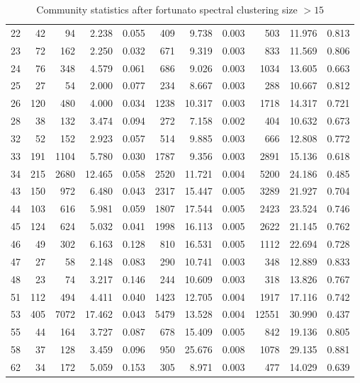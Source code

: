 \begin{table}[ht]
\begin{adjustbox}{max width=\textwidth}
\begin{tabular}{lrrrrrrrrrr}
  22 & 42 & 94 & 2.238 & 0.055 & 409 & 9.738 & 0.003 & 503 & 11.976 & 0.813 \\ 
  23 & 72 & 162 & 2.250 & 0.032 & 671 & 9.319 & 0.003 & 833 & 11.569 & 0.806 \\ 
  24 & 76 & 348 & 4.579 & 0.061 & 686 & 9.026 & 0.003 & 1034 & 13.605 & 0.663 \\ 
  25 & 27 & 54 & 2.000 & 0.077 & 234 & 8.667 & 0.003 & 288 & 10.667 & 0.812 \\ 
  26 & 120 & 480 & 4.000 & 0.034 & 1238 & 10.317 & 0.003 & 1718 & 14.317 & 0.721 \\ 
  28 & 38 & 132 & 3.474 & 0.094 & 272 & 7.158 & 0.002 & 404 & 10.632 & 0.673 \\ 
  32 & 52 & 152 & 2.923 & 0.057 & 514 & 9.885 & 0.003 & 666 & 12.808 & 0.772 \\ 
  33 & 191 & 1104 & 5.780 & 0.030 & 1787 & 9.356 & 0.003 & 2891 & 15.136 & 0.618 \\ 
  34 & 215 & 2680 & 12.465 & 0.058 & 2520 & 11.721 & 0.004 & 5200 & 24.186 & 0.485 \\ 
  43 & 150 & 972 & 6.480 & 0.043 & 2317 & 15.447 & 0.005 & 3289 & 21.927 & 0.704 \\ 
  44 & 103 & 616 & 5.981 & 0.059 & 1807 & 17.544 & 0.005 & 2423 & 23.524 & 0.746 \\ 
  45 & 124 & 624 & 5.032 & 0.041 & 1998 & 16.113 & 0.005 & 2622 & 21.145 & 0.762 \\ 
  46 & 49 & 302 & 6.163 & 0.128 & 810 & 16.531 & 0.005 & 1112 & 22.694 & 0.728 \\ 
  47 & 27 & 58 & 2.148 & 0.083 & 290 & 10.741 & 0.003 & 348 & 12.889 & 0.833 \\ 
  48 & 23 & 74 & 3.217 & 0.146 & 244 & 10.609 & 0.003 & 318 & 13.826 & 0.767 \\ 
  51 & 112 & 494 & 4.411 & 0.040 & 1423 & 12.705 & 0.004 & 1917 & 17.116 & 0.742 \\ 
  53 & 405 & 7072 & 17.462 & 0.043 & 5479 & 13.528 & 0.004 & 12551 & 30.990 & 0.437 \\ 
  55 & 44 & 164 & 3.727 & 0.087 & 678 & 15.409 & 0.005 & 842 & 19.136 & 0.805 \\ 
  58 & 37 & 128 & 3.459 & 0.096 & 950 & 25.676 & 0.008 & 1078 & 29.135 & 0.881 \\ 
  62 & 34 & 172 & 5.059 & 0.153 & 305 & 8.971 & 0.003 & 477 & 14.029 & 0.639 \\ 
   \hline
\end{tabular}
\end{adjustbox}
\caption{Community statistics after fortunato spectral clustering size $> 15$} 
\label{tab:Community statistics after fortunato spectral clustering size > 15}
\end{table}

